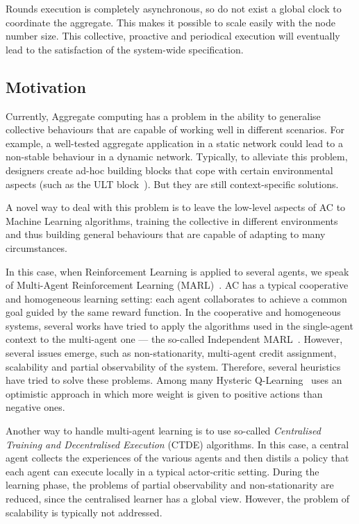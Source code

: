 \documentclass[conference]{IEEEtran}
\begin{document}
Rounds execution is completely asynchronous, so do not exist a global clock to coordinate the aggregate. 
 This makes it possible to scale easily with the node number size. 
 This collective, proactive and periodical execution will eventually lead to the satisfaction of the system-wide specification.

\subsection{Motivation}
Currently, Aggregate computing has a problem in the ability to generalise collective behaviours that are capable of working well in different scenarios. 
 For example, a well-tested aggregate application in a static network could lead to a non-stable behaviour in a dynamic network. 
 Typically, to alleviate this problem, designers create ad-hoc building blocks that cope with certain environmental aspects (such as the ULT block~\cite{DBLP:conf/saso/AudritoCDV17}). 
 But they are still context-specific solutions.

A novel way to deal with this problem is to leave the low-level aspects of AC to Machine Learning algorithms, 
 training the collective in different environments and thus building general behaviours that are capable of adapting to many circumstances.

In this case, when Reinforcement Learning is applied to several agents, we speak of Multi-Agent Reinforcement Learning (MARL)~\cite{DBLP:journals/aamas/Hernandez-LealK19}.
 AC has a typical cooperative and homogeneous learning setting: 
 each agent collaborates to achieve a common goal guided by the same reward function.
%
In the cooperative and homogeneous systems, several works have tried to apply the algorithms used in the single-agent context to the multi-agent one --- 
 the so-called Independent MARL~\cite{DBLP:journals/tsmc/BusoniuBS08}. 
%
However, several issues emerge, such as non-stationarity, multi-agent credit assignment, scalability and partial observability of the system. 
 Therefore, several heuristics have tried to solve these problems.
%
Among many Hysteric Q-Learning~\cite{hysteretic-q} uses an optimistic approach in which more weight is given to positive actions than negative ones.

Another way to handle multi-agent learning is to use so-called \textit{Centralised Training and Decentralised Execution} (CTDE) algorithms. 
 In this case, a central agent collects the experiences of the various agents and then distils a policy that each agent can execute locally in a typical actor-critic setting. 
%
During the learning phase, the problems of partial observability and non-stationarity are reduced, since the centralised learner has a global view. 
 However, the problem of scalability is typically not addressed.
\end{document}
